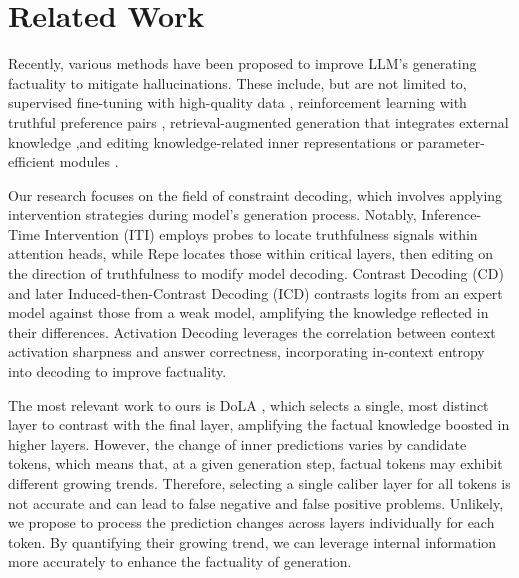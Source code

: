 \section{Related Work}
Recently, various methods have been proposed to improve LLM's generating factuality to mitigate hallucinations. These include, but are not limited to, supervised fine-tuning with high-quality data \cite{tian2023fineSFT,zhou2024limaSFT}, reinforcement learning with truthful preference pairs \cite{sun2023aligningRL,yang2023alignmentRL}, retrieval-augmented generation that integrates external knowledge \cite{chern2023factoolRAG},and editing knowledge-related inner representations or parameter-efficient modules \cite{zhang2024truthx,hu2024separateLORA}.


Our research focuses on the field of constraint decoding, which involves applying intervention strategies during model's generation process.
Notably, Inference-Time Intervention (ITI) \cite{li2024inferenceITI} employs probes to locate truthfulness signals within attention heads, while Repe \cite{zou2023representationZOU} locates those within critical layers, then editing on the direction of truthfulness to modify model decoding.
Contrast Decoding (CD) \cite{li2022contrastiveCD} and later Induced-then-Contrast Decoding (ICD) \cite{zhang2023alleviatingICD} contrasts logits from an expert model against those from a weak model, amplifying the knowledge reflected in their differences.
Activation Decoding \cite{chen2024activation} leverages the correlation between context activation sharpness and answer correctness,
incorporating in-context entropy into decoding to improve factuality.


The most relevant work to ours is  DoLA \cite{chuang2023dola}, which selects a single, most distinct layer to contrast with the final layer, amplifying the factual knowledge boosted in higher layers.
However, the change of inner predictions varies by candidate tokens, which means that, at a given generation step, factual tokens may exhibit different growing trends. Therefore, selecting a single caliber layer for all tokens is not accurate and can lead to false negative and false positive problems. 
Unlikely, we propose to process the prediction changes across layers individually for each token. By quantifying their growing trend, we can leverage internal information more accurately to enhance the factuality of generation.


